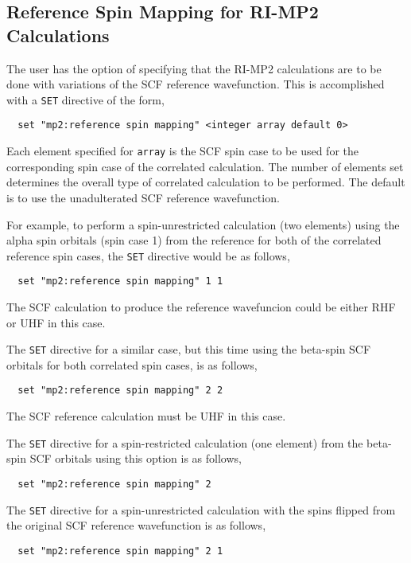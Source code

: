 \subsection{Reference Spin Mapping for RI-MP2 Calculations}

The user has the option of specifying that the RI-MP2 calculations are
to be done with variations of the SCF reference wavefunction.  This is
accomplished with a \verb+SET+ directive of the form,

\begin{verbatim}
  set "mp2:reference spin mapping" <integer array default 0>
\end{verbatim}

Each element specified for \verb+array+ is the SCF spin case to be
used for the corresponding spin case of the correlated calculation.
The number of elements set determines the overall type of correlated
calculation to be performed.  The default is to use the unadulterated
SCF reference wavefunction.

For example, to perform a spin-unrestricted calculation (two elements)
using the alpha spin orbitals (spin case 1) from the reference for
both of the correlated reference spin cases, the \verb+SET+ directive
would be as follows,
\begin{verbatim}
  set "mp2:reference spin mapping" 1 1
\end{verbatim}
The SCF calculation to produce the reference wavefuncion could be either
RHF or UHF in this case.

The \verb+SET+ directive for a similar case, but this time using the
beta-spin SCF orbitals for both correlated spin cases, is as follows,
\begin{verbatim}
  set "mp2:reference spin mapping" 2 2
\end{verbatim}
The SCF reference calculation must be UHF in this case.

The \verb+SET+ directive for a spin-restricted calculation (one
element) from the beta-spin SCF orbitals using this option is as
follows,
\begin{verbatim}
  set "mp2:reference spin mapping" 2
\end{verbatim}

The \verb+SET+ directive for a spin-unrestricted calculation with the
spins flipped from the original SCF reference wavefunction is as
follows,
\begin{verbatim}
  set "mp2:reference spin mapping" 2 1
\end{verbatim}


